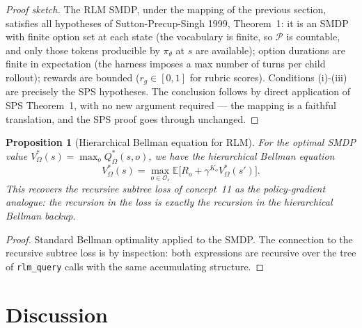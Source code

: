 \documentclass[11pt]{article}
\newtheorem{proposition}[theorem]{Proposition}
\begin{document}
\begin{proof}[Proof sketch]
The RLM SMDP, under the mapping of the previous section, satisfies all
hypotheses of Sutton-Precup-Singh 1999, Theorem~1: it is an SMDP with finite
option set at each state (the vocabulary is finite, so $\mathcal{P}$ is
countable, and only those tokens producible by $\pi_\theta$ at $s$ are
available); option durations are finite in expectation (the harness imposes
a max number of turns per child rollout); rewards are bounded ($r_g \in [0, 1]$
for rubric scores). Conditions (i)-(iii) are precisely the SPS hypotheses.
The conclusion follows by direct application of SPS Theorem~1, with no new
argument required --- the mapping is a faithful translation, and the SPS
proof goes through unchanged.
\end{proof}

\begin{proposition}[Hierarchical Bellman equation for RLM]
For the optimal SMDP value $V^*_\Omega(s) = \max_o Q^*_\Omega(s, o)$, we have
the hierarchical Bellman equation
\[
V^*_\Omega(s) = \max_{o \in \mathcal{O}_s}
   \mathbb{E}\bigl[R_o + \gamma^{K_o} V^*_\Omega(s')\bigr].
\]
This recovers the recursive subtree loss of concept~11 as the policy-gradient
analogue: the recursion in the loss is exactly the recursion in the
hierarchical Bellman backup.
\end{proposition}

\begin{proof}[Proof]
Standard Bellman optimality applied to the SMDP. The connection to the
recursive subtree loss is by inspection: both expressions are recursive over
the tree of \texttt{rlm\_query} calls with the same accumulating structure.
\end{proof}

\section*{Discussion}
\end{document}
